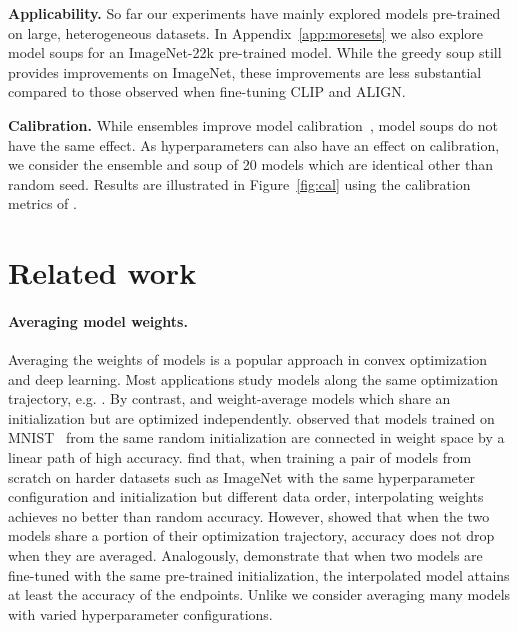 \documentclass[nohyperref]{article}
\theoremstyle{plain}
\theoremstyle{definition}
\theoremstyle{remark}
\begin{document}
        \textbf{Applicability.} 
        So far our experiments have mainly explored
        models pre-trained on large, heterogeneous datasets.
        In Appendix~\ref{app:moresets} we also explore
        model soups for an ImageNet-22k pre-trained
        model.
        While the greedy soup still provides
        improvements on ImageNet, these improvements are less substantial compared to those observed when fine-tuning CLIP and ALIGN.
        
        
        \textbf{Calibration.}
        While ensembles improve model calibration~\cite{guo2017calibration, roelofs2020mitigating},
        model soups do not have the same effect.
        As hyperparameters can also have an effect on calibration,
        we consider the ensemble and soup of 20 models which are identical
        other than random seed.
        Results are illustrated in Figure~\ref{fig:cal} using the calibration
        metrics of \citet{roelofs2020mitigating}.
        
        \section{Related work}\label{sec:related}
        \vspace{-0.25em}
        
        \paragraph{Averaging model weights.}
        Averaging the weights of models is a popular approach
        in convex optimization and deep learning.
        Most applications study models
        along the same optimization trajectory, e.g.
        \cite{ruppert1988efficient,polyak1990new,szegedy2016rethinking,izmailov2018averaging,zhang2019lookahead, kaddour2022questions, junczys2016amu}.
        By contrast, \citet{nagarajan19uniform, frankle2020linear,neyshabur2020being, von2020neural} and \citet{matena2021merging} weight-average
        models which share an initialization but are optimized independently.
        \citet{nagarajan19uniform} observed that models trained on MNIST~\cite{lecun1998mnist} from the same random initialization are connected in weight space by a linear path of high accuracy.
        \citet{frankle2020linear} find that, when training a pair of models from scratch on harder datasets such as ImageNet with the 
        same hyperparameter configuration and initialization but different data order, interpolating weights
        achieves no better than random accuracy. However, \citet{frankle2020linear} showed that when the two models
        share a portion of their optimization trajectory, accuracy does not drop when
        they are averaged.
        Analogously, \citet{neyshabur2020being} demonstrate that when two
        models are fine-tuned with the same pre-trained initialization, the interpolated model attains
        at least the accuracy of the endpoints.
        Unlike \citet{nagarajan19uniform, frankle2020linear,neyshabur2020being} we consider averaging many models
        with varied hyperparameter configurations.
        
\end{document}
